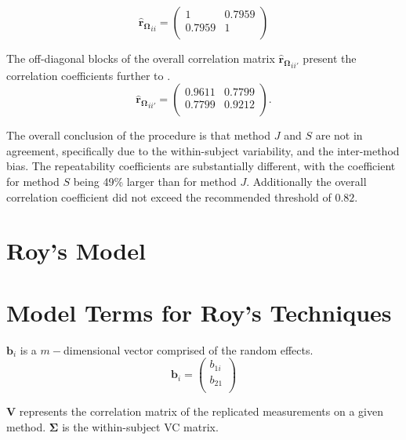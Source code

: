 \begin{equation}
\boldsymbol{\hat{r}_{\Omega}}_{ii} = \left( \begin{array}{cc}
1  & 0.7959  \\
0.7959  & 1  \\
\end{array}\right)
\end{equation}

The off-diagonal blocks of the overall correlation matrix $\boldsymbol{\hat{r}_{\Omega}}_{ii'}$ present the correlation coefficients further to \citet{hamlett}.
\[
\boldsymbol{\hat{r}_{\Omega}}_{ii'} = \left( \begin{array}{cc}
0.9611  & 0.7799  \\
0.7799  & 0.9212  \\
\end{array}\right).
\]

The overall conclusion of the procedure is that method $J$ and $S$ are not in agreement, specifically due to the within-subject variability, and the inter-method bias. The repeatability coefficients are substantially different, with the coefficient for method $S$ being 49\% larger than for method $J$. Additionally the overall correlation coefficient did not exceed the recommended threshold of $0.82$.

\section{Roy's Model}





\section{Model Terms for Roy's Techniques}
$\boldsymbol{b}_{i}$ is a $m-$dimensional vector comprised of
the random effects.
\begin{equation}
\boldsymbol{b}_{i} = \left( \begin{array}{c}
b_{1i} \\
b_{21}  \\
\end{array}\right)
\end{equation}

$\boldsymbol{V}$ represents the correlation matrix of the replicated measurements on a given method.
$\boldsymbol{\Sigma}$ is the within-subject VC matrix.

